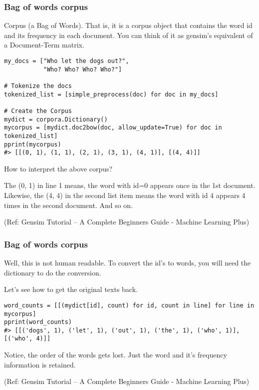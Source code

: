 \begin{frame}[fragile]\frametitle{Bag of words corpus}

Corpus (a Bag of Words). That is, it is a corpus object that contains the word id and its frequency in each document. You can think of it as gensim’s equivalent of a Document-Term matrix.

\begin{lstlisting}
my_docs = ["Who let the dogs out?",
           "Who? Who? Who? Who?"]

# Tokenize the docs
tokenized_list = [simple_preprocess(doc) for doc in my_docs]

# Create the Corpus
mydict = corpora.Dictionary()
mycorpus = [mydict.doc2bow(doc, allow_update=True) for doc in tokenized_list]
pprint(mycorpus)
#> [[(0, 1), (1, 1), (2, 1), (3, 1), (4, 1)], [(4, 4)]]
\end{lstlisting}

How to interpret the above corpus?

The (0, 1) in line 1 means, the word with id=0 appears once in the 1st document.
Likewise, the (4, 4) in the second list item means the word with id 4 appears 4 times in the second document. And so on.

\tiny{(Ref: Gensim Tutorial – A Complete Beginners Guide - Machine Learning Plus)}
\end{frame}

\begin{frame}[fragile]\frametitle{Bag of words corpus}

Well, this is not human readable. To convert the id’s to words, you will need the dictionary to do the conversion.

Let’s see how to get the original texts back.

\begin{lstlisting}
word_counts = [[(mydict[id], count) for id, count in line] for line in mycorpus]
pprint(word_counts)
#> [[('dogs', 1), ('let', 1), ('out', 1), ('the', 1), ('who', 1)], [('who', 4)]]
\end{lstlisting}

Notice, the order of the words gets lost. Just the word and it’s frequency information is retained.

\tiny{(Ref: Gensim Tutorial – A Complete Beginners Guide - Machine Learning Plus)}
\end{frame}

